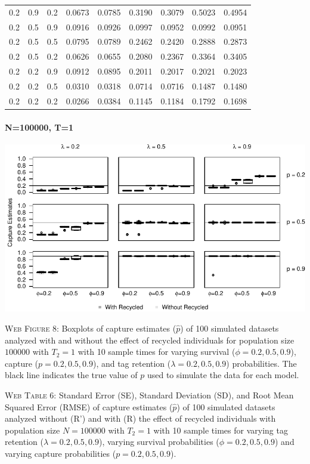 \documentclass[]{article}
\let\oldparagraph\paragraph
\renewcommand{\paragraph}[1]{\oldparagraph{#1}\mbox{}}
\begin{document}
\begin{table}[ht]
{\begin{tabular}{rrrrrrrrr}
  0.2 & 0.9 & 0.2 & 0.0673 & 0.0785 & 0.3190 & 0.3079 & 0.5023 & 0.4954 \\ 
  0.2 & 0.5 & 0.9 & 0.0916 & 0.0926 & 0.0997 & 0.0952 & 0.0992 & 0.0951 \\ 
  0.2 & 0.5 & 0.5 & 0.0795 & 0.0789 & 0.2462 & 0.2420 & 0.2888 & 0.2873 \\ 
  0.2 & 0.5 & 0.2 & 0.0626 & 0.0655 & 0.2080 & 0.2367 & 0.3364 & 0.3405 \\ 
  0.2 & 0.2 & 0.9 & 0.0912 & 0.0895 & 0.2011 & 0.2017 & 0.2021 & 0.2023 \\ 
  0.2 & 0.2 & 0.5 & 0.0310 & 0.0318 & 0.0714 & 0.0716 & 0.1487 & 0.1480 \\ 
  0.2 & 0.2 & 0.2 & 0.0266 & 0.0384 & 0.1145 & 0.1184 & 0.1792 & 0.1698 \\ 
   \hline
\end{tabular}
}
\endgroup
\end{table}

\newpage

\paragraph{N=100000, T=1}\label{n100000-t1-1}

\includegraphics{Appendix_BW_files/figure-latex/8_capture_GJSTL2-1.pdf}

\textsc{Web Figure 8:} Boxplots of capture estimates (\(\hat{p}\)) of
100 simulated datasets analyzed with and without the effect of recycled
individuals for population size \(100000\) with \(T_2=1\) with 10 sample times for varying survival (\(\phi=0.2,0.5,0.9\)), capture
(\(p=0.2,0.5,0.9\)), and tag retention (\(\lambda=0.2,0.5,0.9\))
probabilities. The black line indicates the true value of \(p\) used to
simulate the data for each model.

\textsc{Web Table 6:} Standard Error (SE), Standard Deviation (SD), and
Root Mean Squared Error (RMSE) of capture estimates (\(\hat{p}\)) of 100
simulated datasets analyzed without (R') and with (R) the effect of
recycled individuals with population size \(N=100000\) with \(T_2=1\)
with 10 sample times for varying tag retention
(\(\lambda=0.2,0.5,0.9\)), varying survival probabilities
(\(\phi=0.2,0.5,0.9\)) and varying capture probabilities
(\(p=0.2,0.5,0.9\)).
\end{document}
